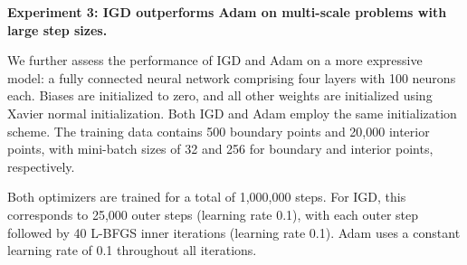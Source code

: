 \documentclass{article}
\begin{document}
\smallskip
\textbf{Experiment 3: IGD outperforms Adam on multi-scale problems with large step sizes.}

We further assess the performance of IGD and Adam on a more expressive model: a fully connected neural network comprising four layers with 100 neurons each. Biases are initialized to zero, and all other weights are initialized using Xavier normal initialization. Both IGD and Adam employ the same initialization scheme. The training data contains 500 boundary points and 20,000 interior points, with mini-batch sizes of 32 and 256 for boundary and interior points, respectively.

Both optimizers are trained for a total of 1,000,000 steps. For IGD, this corresponds to 25,000 outer steps (learning rate 0.1), with each outer step followed by 40 L-BFGS inner iterations (learning rate 0.1). Adam uses a constant learning rate of 0.1 throughout all iterations.
\end{document}
